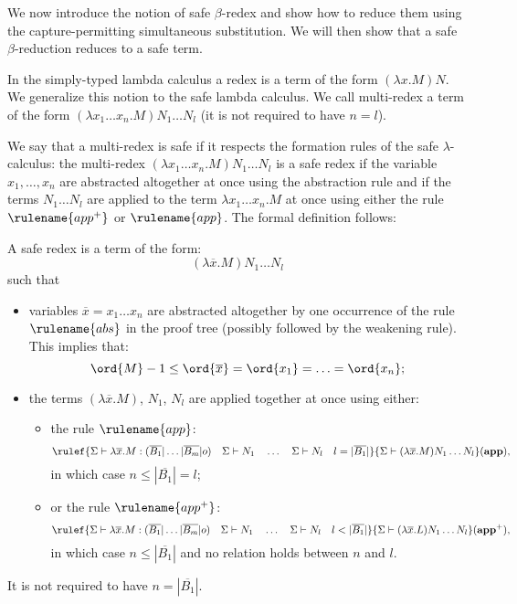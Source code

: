 We now introduce the notion of safe $\beta$-redex and show how to
reduce them using the capture-permitting simultaneous substitution.
We will then show that a safe $\beta$-reduction reduces to a safe
term.


In the simply-typed lambda calculus a redex is a term of the form $(\lambda x . M) N$.
We generalize this notion to the safe lambda calculus. We call multi-redex a term of the form
$(\lambda x_1 \ldots x_n . M) N_1 \ldots N_l$ (it is not required to have $n=l$).


We say that a multi-redex is safe if it respects the formation rules
of the safe $\lambda$-calculus: the multi-redex $(\lambda x_1 \ldots
x_n . M) N_1 \ldots N_l$ is a safe redex if the variable
$x_1,\ldots,x_n$ are abstracted altogether at once using the
abstraction rule and if the terms $N_1 \ldots N_l$ are applied to
the term $\lambda x_1 \ldots x_n . M$ at once using either the rule
$\rulename{app^+}$ or $\rulename{app}$. The formal definition
follows:

\begin{definition}
A safe redex is a term of the form:
$$(\lambda \overline{x} . M) N_1 \ldots N_l$$
such that
\begin{itemize}
  \item variables $\overline{x}=x_1\ldots x_n$ are abstracted
altogether by one occurrence of the rule $\rulename{abs}$ in the
proof tree (possibly followed by the weakening rule). This implies
that:
$$\ord{M} -1 \leq \ord{\overline{x}} = \ord{x_1} = \ldots = \ord{x_n};$$
\item the terms $(\lambda \overline{x} . M)$, $N_1$,
$N_l$ are applied together at once using either:
\begin{itemize}
    \item the rule $\rulename{app}$:
        $$   \rulef{
                    \Sigma \vdash \lambda \overline{x} . M : (\overline{B_1}|\ldots|\overline{B_m}|o)
                    \quad
                    \Sigma \vdash N_1         \quad \ldots \quad \Sigma \vdash N_l
                    \quad l = |\overline{B_1}|
            }
            {
            \Sigma \vdash (\lambda \overline{x} . M) N_1 \ldots N_l
            } (\mathbf{app}),
        $$
        in which case  $n\leq |\overline{B_1}| = l$;

\item or the rule $\rulename{app^+}$:
        $$   \rulef{
                    \Sigma \vdash \lambda \overline{x} . M : (\overline{B_1}|\ldots|\overline{B_m}|o)
                    \quad
                    \Sigma \vdash N_1         \quad \ldots \quad \Sigma \vdash N_l
                    \quad l < |\overline{B_1}|
            }
            {
            \Sigma \vdash (\lambda \overline{x} . L) N_1 \ldots N_l
            } (\mathbf{app^+}),
        $$
      in which case $n \leq |\overline{B_1}|$ and no relation holds between $n$ and $l$.
\end{itemize}
\end{itemize}
It is not required to have $n = |\overline{B_1}|$.
\end{definition}

